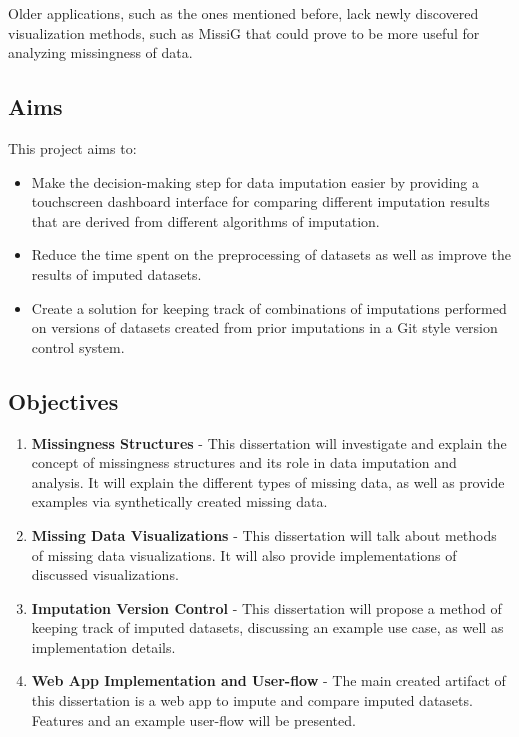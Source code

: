 \documentclass[a4paper, 11pt]{article}
\begin{document}
Older applications, such as the ones mentioned before, lack newly discovered
visualization methods, such as MissiG \cite{fernstad_explore_2022} that could
prove to be more useful for analyzing missingness of data. 

\subsection{Aims} 

This project aims to:
\begin{itemize} 

        \item Make the decision-making step for data imputation easier by
                providing a touchscreen dashboard interface for comparing
                different imputation results that are derived from different
                algorithms of imputation. 

        \item Reduce the time spent on the preprocessing of datasets as well as
                improve the results of imputed datasets.

        \item Create a solution for keeping track of combinations of
                imputations performed on versions of datasets created from
                prior imputations in a Git \cite{noauthor_git_nodate} style
                version control system. 

\end{itemize}

\subsection{Objectives}

\begin{enumerate}

\item \textbf{Missingness Structures} - This dissertation will investigate and
        explain the concept of missingness structures and its role in data
        imputation and analysis. It will explain the different types of missing
        data, as well as provide examples via synthetically created missing
        data.

\item \textbf{Missing Data Visualizations} - This dissertation will talk about
        methods of missing data visualizations. It will also provide
        implementations of discussed visualizations. 
        
\item \textbf{Imputation Version Control} - This dissertation will propose a
        method of keeping track of imputed datasets, discussing an example
        use case, as well as implementation details.

\item \textbf{Web App Implementation and User-flow} - The main created artifact
        of this dissertation is a web app to impute and compare imputed
        datasets. Features and an example user-flow will be presented.

\end{enumerate}
\end{document}
